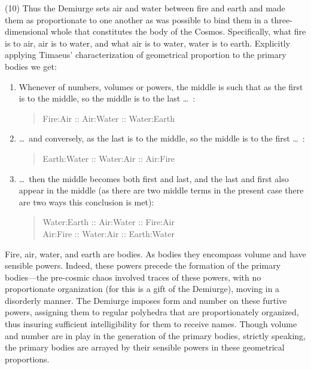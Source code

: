 (10) Thus the Demiurge sets air and water between fire and earth and made them as proportionate to one another as was possible to bind them in a three-dimensional whole that constitutes the body of the Cosmos. Specifically, what fire is to air, air is to water, and what air is to water, water is to earth. Explicitly applying Timaeus' characterization of geometrical proportion to the primary bodies we get:
\begin{enumerate}[(1)]
	\item Whenever of numbers, volumes or powers, the middle is such that as the first is to the middle, so the middle is to the last \ldots\ :
	\begin{quote}
		Fire:Air :: Air:Water :: Water:Earth
	\end{quote}
	\item \ldots\ and conversely, as the last is to the middle, so the middle is to the first \dots\ :
	\begin{quote}
		Earth:Water :: Water:Air :: Air:Fire
	\end{quote}
	\item \ldots\ then the middle becomes both first and last, and the last and first also appear in the middle (as there are two middle terms in the present case there are two ways this conclusion is met):
	\begin{quote}
		Water:Earth :: Air:Water :: Fire:Air\\
		Air:Fire :: Water:Air :: Earth:Water
	\end{quote}
\end{enumerate}
Fire, air, water, and earth are bodies. As bodies they encompass volume and have sensible powers. Indeed, these powers precede the formation of the primary bodies---the pre-cosmic chaos involved traces of these powers, with no proportionate organization (for this is a gift of the Demiurge), moving in a disorderly manner. The Demiurge imposes form and number on these furtive powers, assigning them to regular polyhedra that are proportionately organized, thus insuring sufficient intelligibility for them to receive names. Though volume and number are in play in the generation of the primary bodies, strictly speaking, the primary bodies are arrayed by their sensible powers in these geometrical proportions. 

